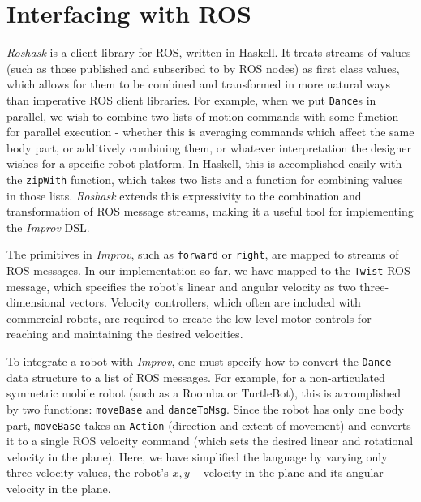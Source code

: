 \documentclass[sigconf]{acmart}
\begin{document}
\section{Interfacing with ROS}\label{interfacing-with-ros}

\emph{Roshask} is a client library for ROS, written in Haskell. It treats streams of values (such as those published
and subscribed to by ROS nodes) as first class values, which allows for them to
be combined and transformed in more natural ways than imperative ROS client
libraries. For example, when we put \texttt{Dance}s in parallel, we wish to combine two
lists of motion commands with some function for parallel execution - whether this
is averaging commands which affect the same body part, or additively combining
them, or whatever interpretation the designer wishes for a specific robot
platform. In Haskell, this is accomplished easily with the
\texttt{zipWith} function, which takes two lists and a function for combining values in
those lists. \emph{Roshask} extends this expressivity to the combination and
transformation of ROS message streams, making it a useful tool for implementing
the \emph{Improv} DSL.

The primitives in \emph{Improv}, such as \texttt{forward} or \texttt{right}, are
mapped to streams of ROS messages. In our implementation so far, we have mapped
to the \texttt{Twist} ROS message, which specifies the robot's linear and
angular velocity as two three-dimensional vectors. Velocity controllers, which
often are included with commercial robots, are required to create the low-level
motor controls for reaching and maintaining the desired velocities. 

To integrate a robot with \emph{Improv}, one must
specify how to convert the \texttt{Dance} data structure to a list of ROS
messages. For example, for a non-articulated symmetric mobile robot (such as a Roomba or
TurtleBot), this is accomplished by two functions: \texttt{moveBase} and
\texttt{danceToMsg}. Since the robot has only one body part, \texttt{moveBase}
takes an \texttt{Action} (direction and extent of movement) and converts it to a
single ROS velocity command (which sets the desired linear and rotational
velocity in the plane). 
Here, we have simplified the language
by varying only three velocity values, the robot's \(x,y-\)velocity in
the plane and its angular velocity in the plane.
\end{document}
